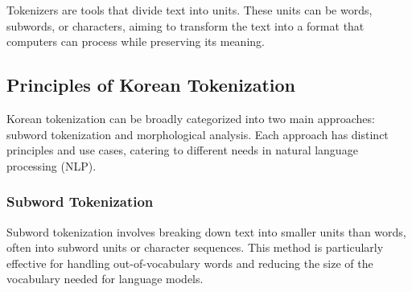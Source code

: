 \documentclass{article}
\begin{document}
Tokenizers are tools that divide text into units. These units can be words, subwords, or characters, aiming to transform the text into a format that computers can process while preserving its meaning.


\subsection{Principles of Korean Tokenization}

Korean tokenization can be broadly categorized into two main approaches: subword tokenization and morphological analysis. Each approach has distinct principles and use cases, catering to different needs in natural language processing (NLP).

\subsubsection{Subword Tokenization}

Subword tokenization involves breaking down text into smaller units than words, often into subword units or character sequences. This method is particularly effective for handling out-of-vocabulary words and reducing the size of the vocabulary needed for language models.
\end{document}
